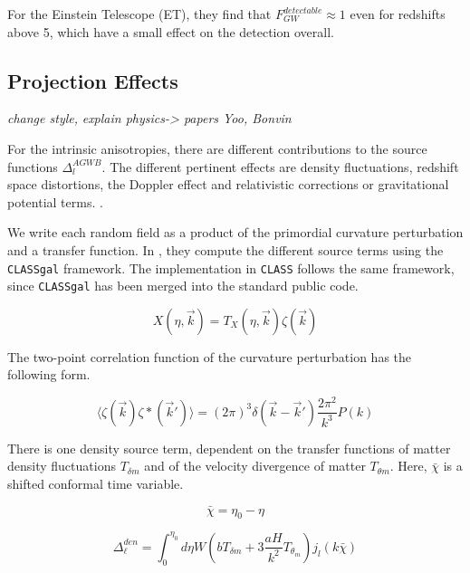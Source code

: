 For the Einstein Telescope (ET), they find that $F_{GW}^{detectable} \approx 1$ even for redshifts above 5, which have a small effect on the detection overall.

\subsection{Projection Effects}

\textit{change style,}
\textit{explain physics-> papers Yoo, Bonvin}

For the intrinsic anisotropies, there are different contributions to the source functions $\Delta_l^{AGWB}$. The different pertinent effects are density fluctuations, redshift space distortions, the Doppler effect and relativistic corrections or gravitational potential terms. \cite{di_dio_classgal_2013}.

We write each random field as a product of the primordial curvature perturbation and a transfer function. In \cite{dallarmi_dipole_2022}, they compute the different source terms using the {\tt CLASSgal} framework. The implementation in {\tt CLASS} follows the same framework, since {\tt CLASSgal} has been merged into the standard public code.

\begin{equation}
    X(\eta, \vec{k}) = T_X(\eta, \vec{k})\zeta(\vec{k})
\end{equation}

The two-point correlation function of the curvature perturbation has the following form.

\begin{equation}
    \langle \zeta(\vec{k})\zeta*(\vec{k}')\rangle = (2\pi)^3 \delta(\vec{k}-\vec{k}')\frac{2\pi^2}{k^3}P(k)
\end{equation}

There is one density source term, dependent on the transfer functions of matter density fluctuations $T_{\delta m}$ and of the velocity divergence of matter $T_{\theta m}$. Here, $\bar{\chi}$ is a shifted conformal time variable.

\begin{equation}
    \bar{\chi} = \eta_0 - \eta 
\end{equation}


\begin{equation}
    \Delta_\ell^{den}=\int_0^{\eta_0} d\eta W \left(b T_{\delta m} +3 \frac{aH}{k^2} T_{\theta_m}\right)j_l(k \bar{\chi})
\end{equation}

